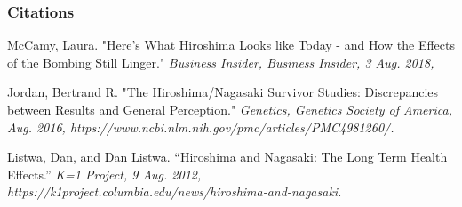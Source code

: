 \newpage

\begin{center}
  \subsubsection{Citations}
\end{center}

McCamy, Laura. "Here's What Hiroshima Looks like Today - and How the Effects
of the Bombing Still Linger." \it{Business Insider, Business Insider}, 3 Aug.
2018,

Jordan, Bertrand R. "The Hiroshima/Nagasaki Survivor Studies: Discrepancies
between Results and General Perception." \it{Genetics}, Genetics Society of
America, Aug. 2016, https://www.ncbi.nlm.nih.gov/pmc/articles/PMC4981260/. 

Listwa, Dan, and Dan Listwa. “Hiroshima and Nagasaki: The Long Term Health
Effects.” \it{K=1 Project}, 9 Aug. 2012, \\
https://k1project.columbia.edu/news/hiroshima-and-nagasaki. 

